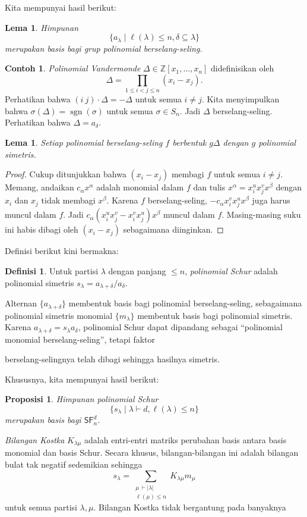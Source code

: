 \documentclass[12pt]{article}
\theoremstyle{plain}
\newtheorem{lemma}[theorem]{Lema}
\newtheorem{proposition}[theorem]{Proposisi}
\theoremstyle{definition}
\newtheorem{definition}[theorem]{Definisi}
\newtheorem{example}[theorem]{Contoh}
\theoremstyle{remark}
\numberwithin{equation}{section}
\begin{document}
Kita mempunyai hasil berikut:
\begin{lemma}
Himpunan
\[
\{ a_\lambda \mid \ell(\lambda) \le n, \delta \subseteq \lambda \}
\]
merupakan basis bagi grup polinomial berselang-seling.

\end{lemma}
\begin{example}
\emph{Polinomial Vandermonde} $\Delta \in \mathbb{Z}[x_1,\ldots,x_n]$
didefinisikan oleh
\[
\Delta = \prod_{1 \le i < j \le n} (x_i-x_j).
\]
Perhatikan bahwa $(i\ j) \cdot \Delta = -\Delta$ untuk semua $i \ne j$.
Kita menyimpulkan bahwa $\sigma(\Delta) = \operatorname{sgn}(\sigma)$
untuk semua $\sigma \in S_n$.
Jadi $\Delta$ berselang-seling.
Perhatikan bahwa $\Delta=a_\delta$.

\end{example}
\begin{lemma}
Setiap polinomial berselang-seling $f$ berbentuk $g \Delta$
dengan $g$ polinomial simetris. 

\end{lemma}
\begin{proof}
Cukup ditunjukkan bahwa $(x_i-x_j)$ membagi $f$ untuk semua $i \ne j$.
Memang, andaikan $c_\alpha x^\alpha$ adalah monomial dalam $f$
dan tulis $x^\alpha = x_i^u x_j^v x^\beta$ dengan $x_i$ dan $x_j$
tidak membagi $x^\beta$.
Karena $f$ berselang-seling, $-c_\alpha x_i^v x_j^u x^\beta$
juga harus muncul dalam $f$.
Jadi $c_\alpha (x_i^u x_j^v - x_i^v x_j^u) x^\beta$ muncul dalam $f$.
Masing-masing suku ini habis dibagi oleh $(x_i-x_j)$ sebagaimana diinginkan.

\end{proof}

Definisi berikut kini bermakna:
\begin{definition}
Untuk partisi $\lambda$ dengan panjang $\le n$, \emph{polinomial Schur}
adalah polinomial simetris
$s_\lambda = a_{\lambda+\delta}/a_\delta$.

\end{definition}
Alternan $\{ a_{\lambda+\delta} \}$ membentuk basis bagi
polinomial berselang-seling, sebagaimana polinomial simetris monomial
$\{ m_\lambda \}$ membentuk basis bagi polinomial
simetris.
Karena $a_{\lambda+\delta}=s_\lambda a_\delta$, polinomial Schur dapat dipandang
sebagai ``polinomial monomial berselang-seling'', tetapi faktor

berselang-selingnya telah dibagi sehingga hasilnya simetris.

Khususnya, kita mempunyai hasil berikut:
\begin{proposition}
Himpunan polinomial Schur
\[
\{ s_\lambda \mid \lambda \vdash d, \ell(\lambda) \le n \}
\]
merupakan basis bagi $\mathsf{SF}^d_n$.

\end{proposition}
\emph{Bilangan Kostka} $K_{\lambda \mu}$ adalah entri-entri matriks
perubahan basis antara basis monomial dan basis Schur.
Secara khusus, bilangan-bilangan ini adalah bilangan bulat tak negatif sedemikian sehingga
\[
s_\lambda = \sum_{\substack{\mu\, \vdash |\lambda|\\\ell(\mu) \le n}} K_{\lambda \mu} m_\mu
\]
untuk semua partisi $\lambda,\mu$. Bilangan Kostka tidak bergantung pada banyaknya
\end{document}
